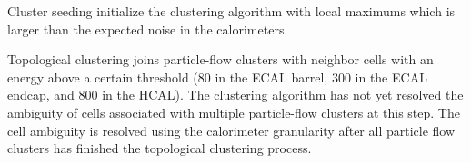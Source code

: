 Cluster seeding initialize the clustering algorithm with local maximums which is larger than the expected noise in the calorimeters.

Topological clustering joins particle-flow clusters with neighbor cells with an energy above a certain threshold (80 \MeV in the ECAL barrel, 300 \MeV in the ECAL endcap, and 800 \MeV in the HCAL).
The clustering algorithm has not yet resolved the ambiguity of cells associated with multiple particle-flow clusters at this step.
The cell ambiguity is resolved using the calorimeter granularity after all particle flow clusters has finished the topological clustering process.
